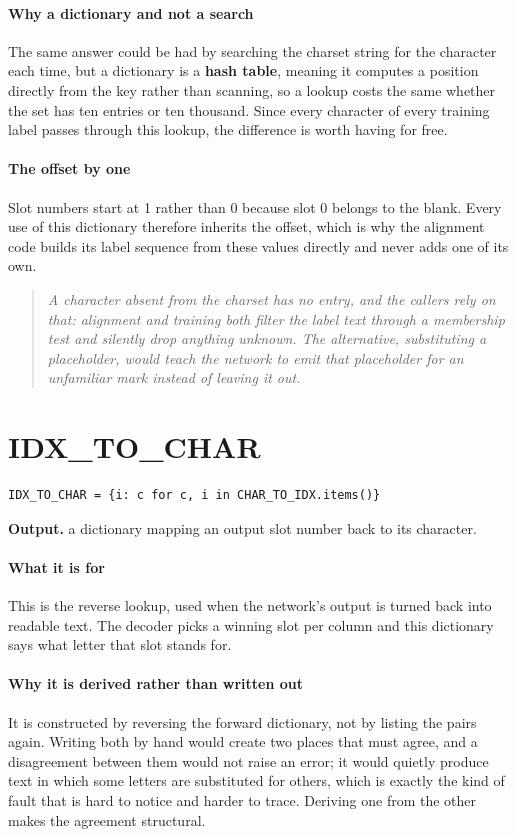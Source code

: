 \paragraph{Why a dictionary and not a search}
The same answer could be had by searching the charset string for the character each time, but a dictionary is a \textbf{hash table}, meaning it computes a position directly from the key rather than scanning, so a lookup costs the same whether the set has ten entries or ten thousand. Since every character of every training label passes through this lookup, the difference is worth having for free.


\paragraph{The offset by one}
Slot numbers start at 1 rather than 0 because slot 0 belongs to the blank. Every use of this dictionary therefore inherits the offset, which is why the alignment code builds its label sequence from these values directly and never adds one of its own.


\begin{quote}\small\itshape A character absent from the charset has no entry, and the callers rely on that: alignment and training both filter the label text through a membership test and silently drop anything unknown. The alternative, substituting a placeholder, would teach the network to emit that placeholder for an unfamiliar mark instead of leaving it out.\end{quote}

\section{IDX\_TO\_CHAR}
\begin{lstlisting}[style=sig]
IDX_TO_CHAR = {i: c for c, i in CHAR_TO_IDX.items()}
\end{lstlisting}

\noindent\textbf{Output.} a dictionary mapping an output slot number back to its character.


\paragraph{What it is for}
This is the reverse lookup, used when the network's output is turned back into readable text. The decoder picks a winning slot per column and this dictionary says what letter that slot stands for.


\paragraph{Why it is derived rather than written out}
It is constructed by reversing the forward dictionary, not by listing the pairs again. Writing both by hand would create two places that must agree, and a disagreement between them would not raise an error; it would quietly produce text in which some letters are substituted for others, which is exactly the kind of fault that is hard to notice and harder to trace. Deriving one from the other makes the agreement structural.


